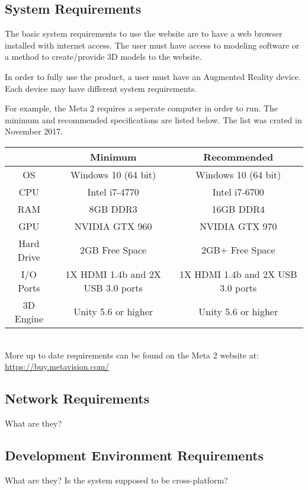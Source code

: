 \subsection{System  Requirements}

The basic system requirements to use the website are to have a web browser installed with internet access.  The user must have access to modeling software or a method to create/provide 3D models to the website.

In order to fully use the product, a user must have an Augmented Reality device.  Each device may have different system requirements.

For example, the Meta 2 requires a seperate computer in order to run.  The minimum and recommended specifications are listed below.  The list was crated in November 2017.

\begin{center}
	\begin{tabular}{ | c | c | c | }
		\hline
		& Minimum & Recommended \\ \hline
		OS & Windows 10 (64 bit) & 	Windows 10 (64 bit) \\ \hline
		CPU & Intel i7-4770 & Intel i7-6700 \\ \hline
		RAM & 8GB DDR3 & 16GB DDR4 \\ \hline
		GPU & NVIDIA GTX 960 & NVIDIA GTX 970 \\ \hline
		Hard Drive & 2GB Free Space & 2GB+ Free Space \\ \hline
		I/O Ports & 1X HDMI 1.4b and 2X USB 3.0 ports & 1X HDMI 1.4b and 2X USB 3.0 ports \\ \hline
		3D Engine & Unity 5.6 or higher & Unity 5.6 or higher \\ \hline
	\end{tabular}
	\\
	More up to date requirements can be found on the Meta 2 website at: \url{https://buy.metavision.com/}
\end{center}


\subsection{Network Requirements}
What are they? 


\subsection{Development Environment Requirements}
What are they?  Is the system supposed to be cross-platform? 

